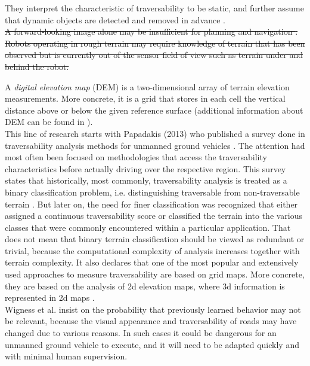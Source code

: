\documentclass[12pt,a4paper]{report}
\newcommand{\term}{\textit}
\newcommand{\acronym}{\MakeUppercase}
\begin{document}
	They interpret the characteristic of traversability to be static, and further 
	assume that dynamic objects are detected and removed in advance \cite{Suger}.
	\\
	
	
	
	
	
	
	
	
	
	\sout{A forward-looking image alone may be insufficient for planning and navigation
	\cite{Kweon}. Robots operating in rough terrain may require knowledge of 
	terrain that has been observed but is currently out of the sensor field of
	view such as terrain under and behind the robot.}
	
	A \term{digital elevation map} (\acronym{dem}) is a two-dimensional array of terrain 
	elevation measurements. More concrete, it is a grid that stores in each cell 
	the vertical distance above or below the given reference surface (additional
	information about \acronym{dem} can be found in \cite{Kweon}).
	\\
	
	This line of research starts with Papadakis (2013) who published a 
	survey done in traversability analysis methods for unmanned ground vehicles 
	\cite{Papadakis}. 
	The attention had most often been focused on methodologies that access the 
	traversability characteristics before actually driving over the respective 
	region.
	This survey states that historically, most commonly, traversability analysis is treated 
	as a binary classification problem, i.e. distinguishing traversable from 
	non-traversable terrain \cite{Suger, Hirose, Wigness}. 
	But later on, the need for finer classification was recognized that either assigned 
	a continuous traversability score or classified the terrain into the various classes 
	that were commonly encountered within a particular application.
	That does not mean that binary terrain classification should be viewed as redundant
	or trivial, because the computational complexity of analysis increases together 
	with terrain complexity.
	It also declares that one of the most popular and extensively used approaches 
	to measure traversability are based on grid 
	maps. More concrete, they are based on the analysis of 2d elevation maps, 
	where 3d information is represented in 2d maps \cite{Suger}.
	\\
	
	
	
	Wigness et al. \cite{Wigness} insist on the probability that previously learned 
	behavior may not be relevant, because the visual appearance and traversability 
	of roads may have changed due to various reasons. In such cases it could be 
	dangerous for an unmanned ground vehicle to execute, and it will need to be 
	adapted quickly and with minimal human supervision.
	
\end{document}
